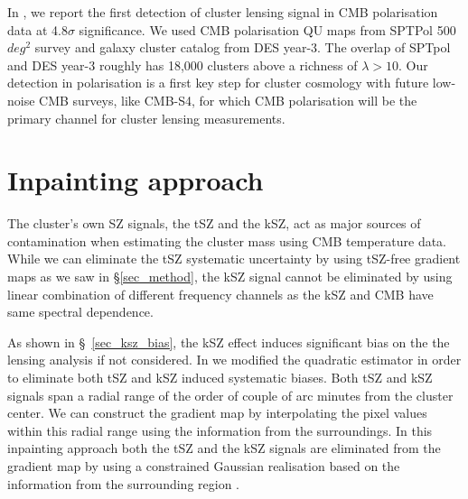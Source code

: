  In \citet{raghunathan19}, we report the first detection of cluster lensing signal in CMB polarisation data at 4.8$\sigma$ significance. We used CMB polarisation QU maps from SPTPol 500 $deg^{2}$ survey and galaxy cluster catalog from DES year-3. The overlap of SPTpol and DES year-3 roughly has 18,000 clusters above a richness of $\lambda  > 10$. %
 Our detection in polarisation is a first key step for cluster cosmology with future low-noise CMB surveys, like CMB-S4, for which 
 CMB polarisation will be the primary channel for cluster lensing measurements.  
 \section{Inpainting approach}
 \label{inpaint}
The cluster's own SZ signals, the tSZ and the kSZ, act as major sources of contamination when estimating the cluster mass using CMB temperature data. 
 While we can eliminate the tSZ systematic uncertainty by using tSZ-free gradient maps as we saw in \S\ref{sec_method}, the kSZ signal cannot be eliminated by using linear combination of different frequency channels as the kSZ and CMB have same spectral dependence. 
 
As shown in \S~\ref{sec_ksz_bias}, the kSZ effect induces significant bias on the the lensing analysis if not considered. 
 In \citet{raghunathan19_in} we modified the quadratic estimator in order to eliminate both tSZ and kSZ induced systematic biases. 
Both tSZ and kSZ signals span a radial range of the order of couple of arc minutes from the cluster center.
 We can construct the gradient map by interpolating the pixel values within this radial range using the information from the surroundings.
 In this inpainting approach both the tSZ and the kSZ signals are eliminated from the gradient map by using a constrained Gaussian realisation based on the information from the surrounding region \citet{benoitlevy13}.
 

